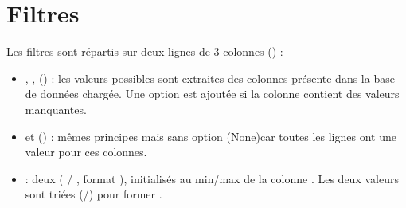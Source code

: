 \documentclass[letterpaper,10pt,english]{sphinxmanual}
\begin{document}
\section{Filtres}
\label{\detokenize{3_Export:filtres}}
\sphinxAtStartPar
Les filtres sont répartis sur deux lignes de 3 colonnes () :
\begin{itemize}
\item {} 
\sphinxAtStartPar
{}, ,  () : les valeurs
possibles sont extraites des colonnes présente dans la base de données chargée. Une option
 est ajoutée si la colonne contient des valeurs manquantes.

\item {} 
\sphinxAtStartPar
{} et  () : mêmes principes mais sans option
{\color{red}\bfseries{}\textasciigrave{}\textasciigrave{}}(None)\textasciigrave{}\textasciigrave{}car toutes les lignes ont une valeur pour ces colonnes.

\item {} 
\sphinxAtStartPar
{} : deux  ( / ,
format ), initialisés au min/max de la colonne . Les deux valeurs sont triées (/) pour former .

\end{itemize}
\end{document}
